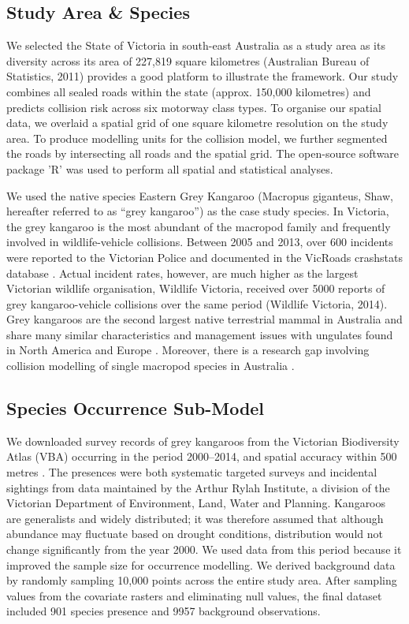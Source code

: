 \subsection{Study Area \& Species}

We selected the State of Victoria in south-east Australia as a study area as its diversity across its area of 227,819 square kilometres (Australian Bureau of Statistics, 2011) provides a good platform to illustrate the framework. Our study combines all sealed roads within the state (approx. 150,000 kilometres) and predicts collision risk across six motorway class types. To organise our spatial data, we overlaid a spatial grid of one square kilometre resolution on the study area. To produce modelling units for the collision model, we further segmented the roads by intersecting all roads and the spatial grid. The open-source software package ’R’ \citep{rdct16} was used to perform all spatial and statistical analyses.

We used the native species Eastern Grey Kangaroo (Macropus giganteus, Shaw, hereafter referred to as “grey kangaroo”) as the case study species. In Victoria, the grey kangaroo is the most abundant of the macropod family and frequently involved in wildlife-vehicle collisions. Between 2005 and 2013, over 600 incidents were reported to the Victorian Police and documented in the VicRoads crashstats database \citep{vicr09}. Actual incident rates, however, are much higher as the largest Victorian wildlife organisation, Wildlife Victoria, received over 5000 reports of grey kangaroo-vehicle collisions over the same period (Wildlife Victoria, 2014). Grey kangaroos are the second largest native terrestrial mammal in Australia and share many similar characteristics and management issues with ungulates found in North America and Europe \citep{crof04,coul10}. Moreover, there is a research gap involving collision modelling of single macropod species in Australia \citep{bond14}.

\subsection{Species Occurrence Sub-Model}

We downloaded survey records of grey kangaroos from the Victorian Biodiversity Atlas (VBA) occurring in the period 2000--2014, and spatial accuracy within 500 metres \citep{depi16}. The presences were both systematic targeted surveys and incidental sightings from data maintained by the Arthur Rylah Institute, a division of the Victorian Department of Environment, Land, Water and Planning.  Kangaroos are generalists and widely distributed; it was therefore assumed that although abundance may fluctuate based on drought conditions, distribution would not change significantly from the year 2000.  We used data from this period because it improved the sample size for occurrence modelling.  We derived background data by randomly sampling 10,000 points across the entire study area.  After sampling values from the covariate rasters and eliminating null values, the final dataset included 901 species presence and 9957 background observations.

